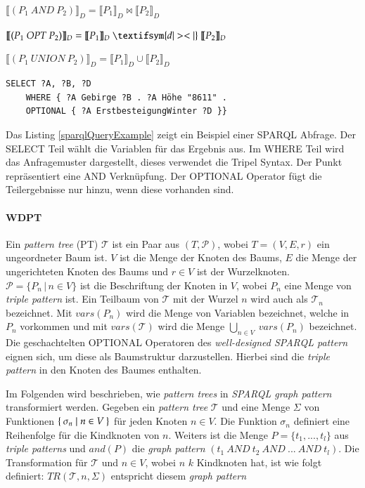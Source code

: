 \documentclass[draft,final]{vutinfth} %
\begin{document}
$\llbracket (P_1 \ AND \ P_2) \rrbracket_D = \llbracket P_1 \rrbracket_D \Join \llbracket P_2 \rrbracket_D$

$\llbracket (P_1 \ OPT \ P_2) \rrbracket_D = \llbracket P_1 \rrbracket_D \ \textifsym{d|><|} \ \llbracket P_2 \rrbracket_D$

$\llbracket (P_1 \ UNION \ P_2) \rrbracket_D = \llbracket P_1 \rrbracket_D \cup \llbracket P_2 \rrbracket_D$




\begin{lstlisting}[language=Sparql,caption={SPARQL Beispiel},frame = single,label={sparqlQueryExample}]
SELECT ?A, ?B, ?D
	WHERE { ?A Gebirge ?B . ?A Höhe "8611" . 
	OPTIONAL { ?A ErstbesteigungWinter ?D }}
\end{lstlisting}

Das Listing \ref{sparqlQueryExample} zeigt ein Beispiel einer SPARQL Abfrage. Der SELECT Teil wählt die Variablen für das Ergebnis aus. Im WHERE Teil wird das Anfragemuster dargestellt, dieses verwendet die Tripel Syntax. Der Punkt repräsentiert eine AND Verknüpfung. Der OPTIONAL Operator fügt die Teilergebnisse nur hinzu, wenn diese vorhanden sind.

\cite{SPARQL,PAG09}


\paragraph{WDPT}

Ein \textit{pattern tree} (PT) $\mathcal{T}$ ist ein Paar aus $(T,\mathcal{P})$, wobei $T = (V,E,r)$ ein ungeordneter Baum ist. $V$ ist die Menge der Knoten des Baums, $E$ die Menge der ungerichteten Knoten des Baums und $r \in V$ ist der Wurzelknoten. $\mathcal{P} = \{P_n \, | \, n \in V\}$ ist die Beschriftung der Knoten in $V$, wobei $P_n$ eine Menge von \textit{triple pattern} ist. Ein Teilbaum von $\mathcal{T}$ mit der Wurzel $n$ wird auch als $\mathcal{T}_n$ bezeichnet. Mit $vars(P_n)$ wird die Menge von Variablen bezeichnet, welche in $P_n$ vorkommen und mit $vars(\mathcal{T})$ wird die Menge $\bigcup_{n \in V} \ vars(P_n)$ bezeichnet. Die geschachtelten OPTIONAL Operatoren des \textit{well-designed SPARQL pattern} eignen sich, um diese als Baumstruktur darzustellen. Hierbei sind die \textit{triple pattern} in den Knoten des Baumes enthalten.

Im Folgenden wird beschrieben, wie \textit{pattern trees} in \textit{SPARQL graph pattern} transformiert werden. Gegeben ein \textit{pattern tree} $\mathcal{T}$ und eine Menge $\Sigma$ von Funktionen $\Set{ \sigma_n | n \in V }$ für jeden Knoten $n \in V$. Die Funktion $\sigma_n$ definiert eine Reihenfolge für die Kindknoten von $n$. Weiters ist die Menge $P = \{t_1,...,t_l\}$ aus \textit{triple patterns} und $and(P)$ die \textit{graph pattern} $(t_1 \ AND \ t_2 \ AND \ ... \ AND \ t_l)$. Die Transformation für $\mathcal{T}$ und $n \in V$, wobei $n$ $k$ Kindknoten hat, ist wie folgt definiert: $TR(\mathcal{T},n,\Sigma)$ entspricht diesem \textit{graph pattern}
\end{document}
